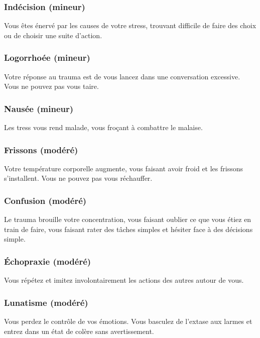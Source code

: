 \subsubsection{Indécision (mineur)} 

Vous êtes énervé par les causes de votre stress, trouvant difficile de faire des choix ou de choisir une suite d'action. 

\subsubsection{Logorrhoée (mineur)} 

Votre réponse au trauma est de vous lancez dans une conversation excessive. Vous ne pouvez pas vous taire. 

\subsubsection{Nausée (mineur)} 

Les tress vous rend malade, vous froçant à combattre le malaise. 

\subsubsection{Frissons (modéré)} 

Votre température corporelle augmente, vous faisant avoir froid et les frissons s'installent. Vous ne pouvez pas vous réchauffer. 

\subsubsection{Confusion (modéré)} 

Le trauma brouille votre concentration, vous faisant oublier ce que vous étiez en train de faire, vous faisant rater des tâches simples et hésiter face à des décisions simple. 

\subsubsection{Échopraxie (modéré)} 

Vous répétez et imitez involontairement les actions des autres autour de vous. 

\subsubsection{Lunatisme (modéré)} 

Vous perdez le contrôle de vos émotions. Vous basculez de l'extase aux larmes et entrez dans un état de colère sans avertissement. 

